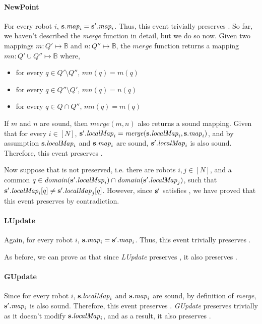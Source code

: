 \paragraph{NewPoint}
For every robot $i$, ${\textbf{s}}.\mathit{map}_i = {\textbf{s}}'.\mathit{map}_i$. Thus, this event trivially preserves . So far, we haven't described the \emph{merge} function in detail, but we do so now. Given two mappings $m:Q'\mapsto \mathbb{B}$ and $n:Q''\mapsto \mathbb{B}$, the $\mathit{merge}$ function returns a mapping $\mathit{mn}: Q'\cup Q'' \mapsto \mathbb{B}$ where, \begin{itemize}
      \item for every $q \in Q'\setminus Q''$, $\mathit{mn}(q) = m(q)$
      \item for every $q \in Q''\setminus Q'$, $\mathit{mn}(q) = n(q)$
      \item for every $q \in Q \cap Q''$, $\mathit{mn}(q) = m(q) $
\end{itemize}
If $m$ and $n$ are sound, then $\mathit{merge}(m,n)$ also returns a sound mapping. Given that for every $i\in [N]$, ${\textbf{s}}'.\mathit{localMap}_i = \mathit{merge}({\textbf{s}}.\mathit{localMap}_i,{\textbf{s}}.\mathit{map}_i)$, and by assumption ${\textbf{s}}.\mathit{localMap}_i$ and ${\textbf{s}}.\mathit{map}_i$ are sound, ${\textbf{s}}'.\mathit{localMap}_i$ is also sound. Therefore, this event preserves .

Now suppose that  is not preserved, i.e. there are robots  $i, j \in [N]$, and a common $q \in \mathit{domain}({\textbf{s}}'.\mathit{localMap}_i)\cap\mathit{domain}({\textbf{s}}'.\mathit{localMap}_j)$, such that ${\textbf{s}}'.\mathit{localMap}_i[q] \neq {\textbf{s}}'.\mathit{localMap}_j[q]$. However, since ${\textbf{s}}'$ satisfies , we have proved that this event preserves  by contradiction.

\paragraph{LUpdate}
Again, for every robot $i$, ${\textbf{s}}.\mathit{map}_i = {\textbf{s}}'.\mathit{map}_i$. Thus, this event trivially preserves .

As before, we can prove as that since \emph{LUpdate} preserves , it also preserves .

\paragraph{GUpdate}
Since for every robot $i$, ${\textbf{s}}.\mathit{localMap}_i$ and ${\textbf{s}}.\mathit{map}_i$ are sound, by definition of \emph{merge},  ${\textbf{s}}'.\mathit{map}_i$ is also sound. Therefore, this event preserves . \emph{GUpdate} preserves  trivially as it doesn't modify ${\textbf{s}}.\mathit{localMap}_i$, and as a result, it also preserves .


